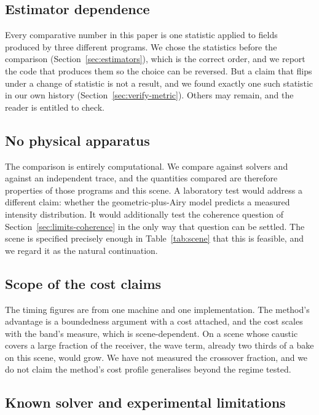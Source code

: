 \subsection{Estimator dependence}
\label{sec:limits-estimators}

Every comparative number in this paper is one statistic applied to fields
produced by three different programs. We chose the statistics before the
comparison (Section~\ref{sec:estimators}), which is the correct order, and we
report the code that produces them so the choice can be reversed. But a claim
that flips under a change of statistic is not a result, and we found exactly one
such statistic in our own history
(Section~\ref{sec:verify-metric}). Others may remain, and the reader is
entitled to check.

\subsection{No physical apparatus}
\label{sec:limits-lab}

The comparison is entirely computational. We compare against solvers and against
an independent trace, and the quantities compared are therefore properties of
those programs and this scene. A laboratory test would address a different
claim: whether the geometric-plus-Airy model predicts a measured intensity
distribution. It would additionally test the coherence question of
Section~\ref{sec:limits-coherence} in the only way that question can be settled.
The scene is specified precisely enough in Table~\ref{tab:scene} that this is
feasible, and we regard it as the natural continuation.

\subsection{Scope of the cost claims}
\label{sec:limits-cost}

The timing figures are from one machine and one implementation. The method's
advantage is a boundedness argument with a cost attached, and the cost scales
with the band's measure, which is scene-dependent. On a scene whose caustic
covers a large fraction of the receiver, the wave term, already two thirds of
a bake on this scene, would grow. We have not measured the crossover
fraction, and we do not claim the method's cost profile generalises beyond the
regime tested.

\subsection{Known solver and experimental limitations}
\label{sec:limits-solvers}

